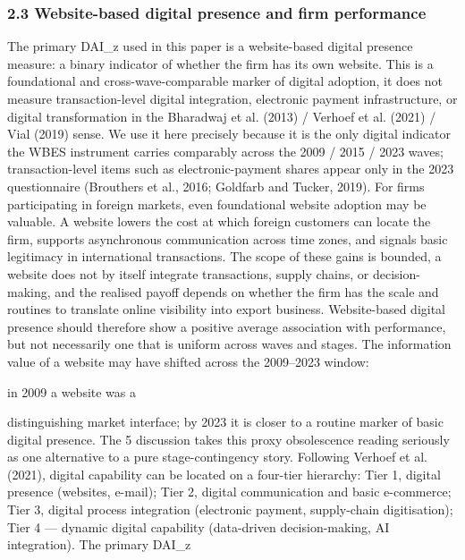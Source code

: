 \documentclass[12pt,a4paper]{article}
\begin{document}
\hypertarget{23-website-based-digital-presence-and-firm-performance}{%
\subsubsection{2.3 Website-based digital presence and firm
performance}\label{23-website-based-digital-presence-and-firm-performance}}

The primary DAI\_z used in this paper is a website-based digital
presence measure: a binary indicator of whether the firm has its own
website. This is a foundational and cross-wave-comparable marker of
digital adoption, it does not measure transaction-level digital
integration, electronic payment infrastructure, or digital
transformation in the Bharadwaj et al. (2013) / Verhoef et al. (2021) /
Vial (2019) sense. We use it here precisely because it is the only
digital indicator the WBES instrument carries comparably across the 2009
/ 2015 / 2023 waves; transaction-level items such as electronic-payment
shares appear only in the 2023 questionnaire (Brouthers et al., 2016;
Goldfarb and Tucker, 2019). For firms participating in foreign markets,
even foundational website adoption may be valuable. A website lowers the
cost at which foreign customers can locate the firm, supports
asynchronous communication across time zones, and signals basic
legitimacy in international transactions. The scope of these gains is
bounded, a website does not by itself integrate transactions, supply
chains, or decision-making, and the realised payoff depends on whether
the firm has the scale and routines to translate online visibility into
export business. Website-based digital presence should therefore show a
positive average association with performance, but not necessarily one
that is uniform across waves and stages. The information value of a
website may have shifted across the 2009--2023 window:

in 2009 a website was a

distinguishing market interface; by 2023 it is closer to a routine
marker of basic digital presence. The 5 discussion takes this proxy
obsolescence reading seriously as one alternative to a pure
stage-contingency story. Following Verhoef et al. (2021), digital
capability can be located on a four-tier hierarchy: Tier 1, digital
presence (websites, e-mail); Tier 2, digital communication and basic
e-commerce; Tier 3, digital process integration (electronic payment,
supply-chain digitisation); Tier 4 --- dynamic digital capability
(data-driven decision-making, AI integration). The primary DAI\_z
\end{document}
